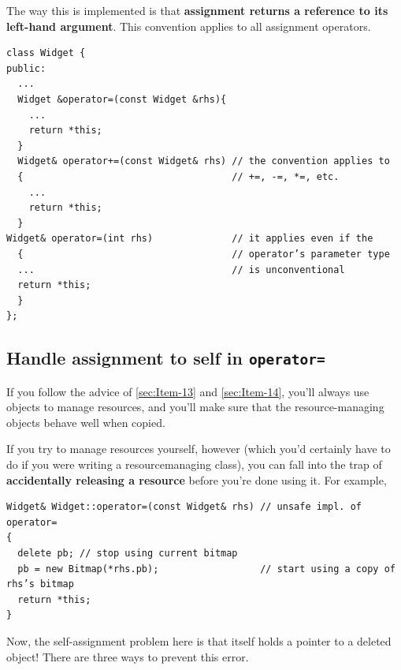\documentclass[a4paper,twoside]{article}
\theoremstyle{definition}
\theoremstyle{remark}
\numberwithin{equation}{section}
\let\OldTexttt\texttt
\renewcommand{\texttt}[1]{{\color{blue} \OldTexttt{#1}}}
\begin{document}
The way this is implemented is that \textbf{assignment returns a
  reference to its left-hand argument}. This convention applies to all
assignment operators.

\begin{verbatim}
class Widget {
public:
  ...
  Widget &operator=(const Widget &rhs){
    ...
    return *this;
  }
  Widget& operator+=(const Widget& rhs) // the convention applies to 
  {                                     // +=, -=, *=, etc.
    ...
    return *this;
  }
Widget& operator=(int rhs)              // it applies even if the
  {                                     // operator’s parameter type
  ...                                   // is unconventional
  return *this;
  }
};
\end{verbatim}

\subsection{Handle assignment to self in \texttt{operator=}}
\label{sec:Item-11}

If you follow the advice of \ref{sec:Item-13} and \ref{sec:Item-14},
you'll always use objects to  manage resources, and you'll make sure
that the resource-managing objects behave well when copied.

If you try to manage resources yourself, however (which you'd
certainly have to do if you were writing a resourcemanaging class),
you can fall into the trap of \textbf{accidentally releasing a
  resource} before you're done using it. For example,
\begin{verbatim}
Widget& Widget::operator=(const Widget& rhs) // unsafe impl. of operator=
{
  delete pb; // stop using current bitmap
  pb = new Bitmap(*rhs.pb);                  // start using a copy of rhs’s bitmap
  return *this;                              
}
\end{verbatim}

Now, the self-assignment problem here is that itself holds a pointer
to a deleted object! There are three ways to prevent this error.
\end{document}
